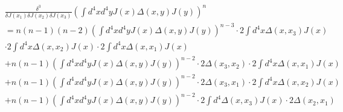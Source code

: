 \documentclass[a4paper]{article}
\begin{document}
\begin{equation}
    \begin{split}
        &\frac{\delta^3}{\delta J(x_{1})\delta J(x_{2})\delta J(x_{3})}(\int{d^4xd^4yJ(x)\Delta(x,y) J(y)})^{n}\\
        &=n(n-1)(n-2)(\int{d^4xd^4yJ(x)\Delta(x,y) J(y)})^{n-3}\cdot 2\int{d^4x \Delta(x,x_{3}) J(x)}\\ 
        &\cdot 2\int{d^4x \Delta(x,x_{2}) J(x)}\cdot2\int{d^4x \Delta(x,x_{1}) J(x)}\\
        &+n(n-1)(\int{d^4xd^4yJ(x)\Delta(x,y) J(y)})^{n-2}\cdot 2 \Delta(x_{3},x_{2})\cdot2\int{d^4x \Delta(x,x_{1})J(x)}\\
        &+n(n-1)(\int{d^4xd^4yJ(x)\Delta(x,y) J(y)})^{n-2}\cdot 2 \Delta(x_{3},x_{1})\cdot2\int{d^4x \Delta(x,x_{2})J(x)}\\
        &+n(n-1)(\int{d^4xd^4yJ(x)\Delta(x,y) J(y)})^{n-2}\cdot2\int{d^4\Delta(x,x_{3})J(x)} \cdot2\Delta(x_{2},x_{1})\\
    \end{split}
\end{equation}
\end{document}
